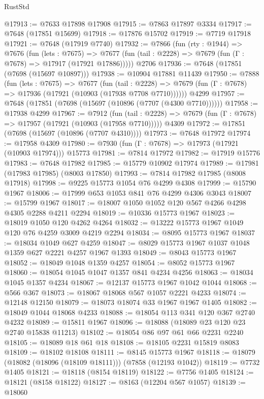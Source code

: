 \begin{lexlean}{RustStd}
\begin{coremodule}
{\begin{coremodule}
{{{{{{{{{{{{{{{{{{{{{{{{{{{{{{{{{{{{{{{{{{{{{{{{{{{{{@17913 := @7633 @17898 @17908
@17915 := @7863 @17897 @3334
@17917 := @7648 (@17851 @15699)
@17918 := @17876 @15702
@17919 := @7719 @17918
@17921 := @7648 (@17919 @7740)
@17932 := @7866
    (fun (rty : @1944) =>
    @7676
      (fun (lets : @7675) =>
      @7677 (fun (tail : @2228) => @7679 (fun (Γ : @7678) => @17917 (@17921 @17886)))))
    @2706
@17936 := @7648 (@17851 (@7698 (@15697 @10897)))
@17938 := @10904 @17881 @11439
@17950 := @7888
    (fun (lets : @7675) =>
    @7677
      (fun (tail : @2228) =>
      @7679 (fun (Γ : @7678) => @17936 (@17921 (@10903 (@17938 @7708 @7710))))))
    @4299
@17957 := @7648 (@17851 (@7698 (@15697 (@10896 (@7707 (@4300 @7710))))))
@17958 := @17938 @4299
@17967 := @7912
    (fun (tail : @2228) => @7679 (fun (Γ : @7678) => @17957 (@17921 (@10903 (@17958 @7710)))))
    @4309
@17972 := @17851 (@7698 (@15697 (@10896 (@7707 @4310))))
@17973 := @7648 @17972
@17974 := @17958 @4309
@17980 := @7930 (fun (Γ : @7678) => @17973 (@17921 (@10903 @17974))) @15773
@17981 := @7814 @17972
@17982 := @17919 @15776
@17983 := @7648 @17982
@17985 := @15779 @10902 @17974
@17989 := @17981 (@17983 @17985) (@8003 @17850)
@17993 := @7814 @17982 @17985 (@8008 @17918)
@17998 := @9225 @15773 @1054 @76 @4299 @4308
@17999 := @15790 @1967
@18006 := @17999 @653 @1053 @841 @76 @4299 @4306 @3043
@18007 := @15799 @1967
@18017 := @18007 @1050 @1052 @120 @567 @4266 @4298 @4305 @2288 @4211 @2294
@18019 := @10336 @15773 @1967
@18023 := @18019 @1050 @120 @4262 @4264
@18032 := @13222 @15773 @1967 @1049 @120 @76 @4259 @3009 @4219 @2294
@18034 := @8095 @15773 @1967
@18037 := @18034 @1049 @627 @4259
@18047 := @8029 @15773 @1967 @1037 @1048 @1359 @627 @2221 @4257 @1967 @1393
@18049 := @8043 @15773 @1967
@18052 := @18049 @1048 @1359 @4257
@18054 := @8052 @15773 @1967
@18060 := @18054 @1045 @1047 @1357 @841 @4234 @4256
@18063 := @18034 @1045 @1357 @4234
@18067 := @12137 @15773 @1967 @1042 @1044
@18068 := @566 @367
@18073 := @18067 @18068 @567 @1057 @2221 @4233
@18074 := @12148 @12150
@18079 := @18073 @18074 @33 @1967 @1967 @1405
@18082 := @18049 @1044 @18068 @4233
@18088 := @18054 @113 @341 @120 @367 @2740 @4232
@18089 := @15811 @1967
@18096 := @18088 (@18089 @23 @120 @23 @2740 @15838 @11213)
@18102 := @18054 @86 @97 @61 @66 @2231 @2240
@18105 := @18089 @18 @61 @18
@18108 := @18105 @2231 @15819 @8083
@18109 := @18102 @18108
@18111 := @8145 @15773 @1967
@18118 := @18079 (@18082 (@18096 (@18109 @18111))) (@7858 (@12193 @1042))
@18119 := @7732 @1405
@18121 := @18118 (@8154 @18119)
@18122 := @7756 @1405
@18124 := @18121 (@8158 @18122)
@18127 := @8163 (@12204 @567 @1057)
@18139 := @18060
}}}}}}}}}}}}}}}}}}}}}}}}}}}}}}}}}}}}}}}}}}}}}}}}}}}}}
\end{coremodule}}
\end{coremodule}
\end{lexlean}
